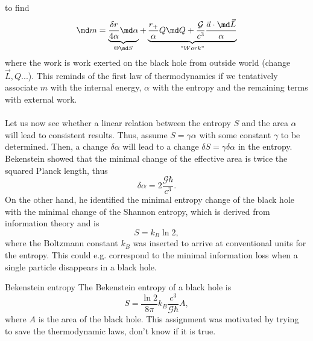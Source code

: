 	 to find
	 \begin{equation}
	 	\md m =\underbrace{ \frac{\delta r}{4 \alpha } \md \alpha}_{ \Theta\md S} +\underbrace{ \frac{r_+}{\alpha} Q \md Q + \frac{\mathcal{G}}{c^3} \frac{\vec{a}\cdot \md \vec{L}}{\alpha }}_{"Work"}
	 \end{equation}
	 where the work is work exerted on the black hole from outside world (change $\vec{L}, Q$...). This reminds of the first law of thermodynamics if we tentatively associate $m$ with the internal energy, $α$ with the entropy and the remaining
	 terms with external work. \\
	 \\
	 Let us now see whether a linear relation between the entropy $S$ and the
	 area $α$ will lead to consistent results. Thus, assume $S = γα$ with some
	 constant $γ$ to be determined. Then, a change $δα$ will lead to a change
	 $δS = γδα$ in the entropy. Bekenstein showed that the minimal change of the effective area is twice
	 the squared Planck length, thus
	 \begin{equation}
	 	\delta \alpha =2 \frac{\mathcal{G}\hbar}{c^3}.
	 \end{equation}
	 On the other hand, he identified the minimal entropy change of the black
	 hole with the minimal change of the Shannon entropy, which is derived
	 from information theory and is
	 \begin{equation}
	 	S = k_B \ln 2,
	 \end{equation}
	 where the Boltzmann constant $k_B$ was inserted to arrive at conventional
	 units for the entropy. This could e.g. correspond to the minimal information loss when a single particle disappears in a black hole.
	\begin{mybox}{Bekenstein entropy }
		The Bekenstein entropy of a black hole is
		\begin{equation}
			S = \frac{\ln 2}{8  \pi } k_B \frac{c^3}{\mathcal{G} \hbar} A,
		\end{equation}
		where $A$ is the area of the black hole. This assignment was motivated by trying to save the thermodynamic laws, don't know if it is true.
	\end{mybox}
